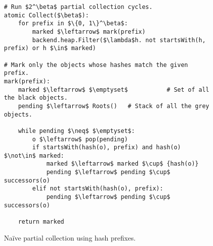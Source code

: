 \begin{figure}[!ht]
  \caption{Naïve partial collection using hash prefixes.}
  \label{alg:partial-prefix}

  \vspace{-.5em}
  \centering
  \begin{lstlisting}
# Run $2^\beta$ partial collection cycles.
atomic Collect($\beta$):
    for prefix in $\{0, 1\}^\beta$:
        marked $\leftarrow$ mark(prefix)
        backend.heap.Filter($\lambda$h. not startsWith(h, prefix) or h $\in$ marked)

# Mark only the objects whose hashes match the given prefix.
mark(prefix):
    marked $\leftarrow$ $\emptyset$           # Set of all the black objects.
    pending $\leftarrow$ Roots()   # Stack of all the grey objects.

    while pending $\neq$ $\emptyset$:
        o $\leftarrow$ pop(pending)
        if startsWith(hash(o), prefix) and hash(o) $\not\in$ marked:
            marked $\leftarrow$ marked $\cup$ {hash(o)}
            pending $\leftarrow$ pending $\cup$ successors(o)
        elif not startsWith(hash(o), prefix):
            pending $\leftarrow$ pending $\cup$ successors(o)

    return marked
\end{lstlisting}
\end{figure}
